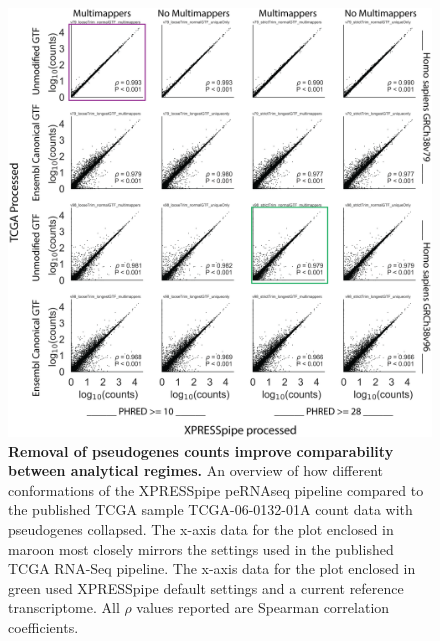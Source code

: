 \documentclass[10pt, oneside]{article}
\begin{document}
\begin{figure}
\centering
  \includegraphics[width=180mm]{figures/xpresspipe_supplement11.png}
  \caption{\textbf{Removal of pseudogenes counts improve comparability between analytical regimes.} An overview of how different conformations of the XPRESSpipe peRNAseq pipeline compared to the published TCGA sample TCGA-06-0132-01A count data with pseudogenes collapsed. The x-axis data for the plot enclosed in maroon most closely mirrors the settings used in the published TCGA RNA-Seq pipeline. The x-axis data for the plot enclosed in green used XPRESSpipe default settings and a current reference transcriptome. All $\rho$ values reported are Spearman correlation coefficients.}
  \label{fig:supplement7}
\end{figure}
\end{document}
